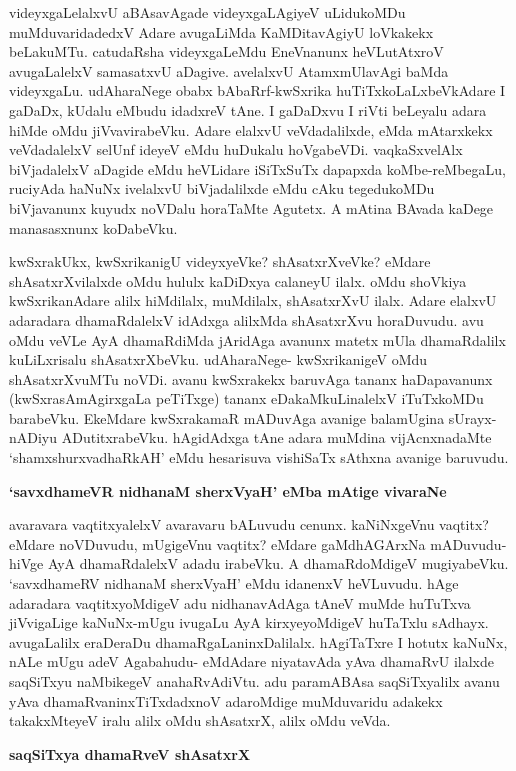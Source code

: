 \noindent
videyxgaLelalxvU aBAsavAgade videyxgaLAgiyeV uLidukoMDu muMduvaridadedxV Adare avugaLiMda KaMDitavAgiyU loVkakekx beLakuMTu. catudaRsha videyxgaLeMdu EneVnanunx heVLutAtxroV avugaLalelxV samasatxvU aDagive. avelalxvU AtamxmUlavAgi baMda videyxgaLu. udAharaNege obabx bAbaRrf-kwSxrika huTiTxkoLaLxbeVkAdare I gaDaDx, kUdalu eMbudu idadxreV tAne. I gaDaDxvu I riVti beLeyalu adara hiMde oMdu jiVvavirabeVku. Adare elalxvU veVdadalilxde, eMda mAtarxkekx veVdadalelxV selUnf ideyeV eMdu huDukalu hoVgabeVDi. vaqkaSxvelAlx biVjadalelxV aDagide eMdu heVLidare iSiTxSuTx dapapxda koMbe-reMbegaLu, ruciyAda haNuNx ivelalxvU biVjadalilxde eMdu cAku tegedukoMDu biVjavanunx kuyudx noVDalu horaTaMte Agutetx. A mAtina BAvada kaDege manasasxnunx koDabeVku. 

kwSxrakUkx, kwSxrikanigU videyxyeVke? shAsatxrXveVke? eMdare shAsatxrXvilalxde oMdu hululx kaDiDxya calaneyU ilalx. oMdu shoVkiya kwSxrikanAdare alilx hiMdilalx, muMdilalx, shAsatxrXvU ilalx. Adare elalxvU adaradara dhamaRdalelxV idAdxga alilxMda shAsatxrXvu horaDuvudu. avu oMdu veVLe AyA dhamaRdiMda jAridAga avanunx matetx mUla dhamaRdalilx kuLiLxrisalu shAsatxrXbeVku. udAharaNege- kwSxrikanigeV oMdu shAsatxrXvuMTu noVDi. avanu kwSxrakekx baruvAga tananx haDapavanunx (kwSxrasAmAgirxgaLa peTiTxge) tananx eDakaMkuLinalelxV iTuTxkoMDu barabeVku. EkeMdare kwSxrakamaR mADuvAga avanige balamUgina sUrayx-nADiyu ADutitxrabeVku. hAgidAdxga tAne adara muMdina vijAcnxnadaMte `shamxshurxvadhaRkAH' eMdu hesarisuva vishiSaTx sAthxna avanige baruvudu.

{\bigskip
\noindent
{\large\bf `savxdhameVR nidhanaM sherxVyaH' eMba mAtige vivaraNe}}\label{197}
\medskip

\noindent
avaravara vaqtitxyalelxV avaravaru bALuvudu cenunx. kaNiNxgeVnu vaqtitx? eMdare noVDuvudu, mUgigeVnu vaqtitx? eMdare gaMdhAGArxNa mADuvudu- hiVge AyA dhamaRdalelxV adadu irabeVku. A dhamaRdoMdigeV mugiyabeVku. `savxdhameRV nidhanaM sherxVyaH' eMdu idanenxV heVLuvudu. hAge adaradara vaqtitxyoMdigeV adu nidhanavAdAga tAneV muMde huTuTxva jiVvigaLige kaNuNx-mUgu ivugaLu AyA kirxyeyoMdigeV huTaTxlu sAdhayx. avugaLalilx eraDeraDu dhamaRgaLaninxDalilalx. hAgiTaTxre I hotutx kaNuNx, nALe mUgu adeV Agabahudu- eMdAdare niyatavAda yAva dhamaRvU ilalxde saqSiTxyu naMbikegeV anahaRvAdiVtu. adu paramABAsa saqSiTxyalilx avanu yAva dhamaRvaninxTiTxdadxnoV adaroMdige muMduvaridu adakekx takakxMteyeV iralu alilx oMdu shAsatxrX, alilx oMdu veVda.

\eject

{\noindent
{\large\bf saqSiTxya dhamaRveV shAsatxrX}}
\medskip

